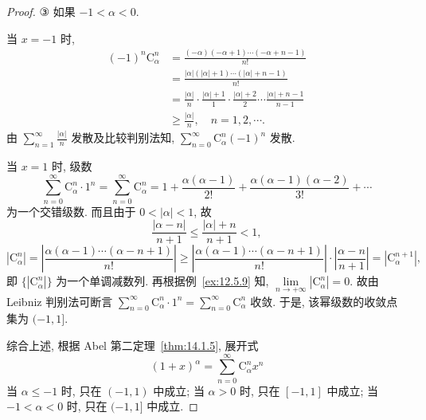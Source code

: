 \begin{proof}
③ 如果 $-1<\alpha<0$.

当 $x=-1$ 时,
\[
  \begin{aligned}
    (-1)^{n}\mathrm{C}_{\alpha}^{n}&=\frac{(-\alpha)(-\alpha+1)\cdots(-\alpha+n-1)}{n!}\\
    &=\frac{|\alpha|(|\alpha|+1)\cdots(|\alpha|+n-1)}{n!}\\
    &=\frac{|\alpha|}{n}\cdot\frac{|\alpha|+1}{1}\cdot\frac{|\alpha|+2}{2}\cdots\frac{|\alpha|+n-1}{n-1}\\
    &\geqslant\frac{|\alpha|}{n},\quad n=1,2,\cdots.
  \end{aligned}
\]
由 $\sum_{n=1}^{\infty}\frac{|\alpha|}{n}$ 发散及比较判别法知, $\sum_{n=0}^{\infty}\mathrm{C}_{\alpha}^{n}(-1)^{n}$ 发散.

当 $x=1$ 时, 级数
\[
  \sum_{n=0}^{\infty}\mathrm{C}_{\alpha}^{n}\cdot1^{n}=\sum_{n=0}^{\infty}\mathrm{C}_{\alpha}^{n}=1+\frac{\alpha(\alpha-1)}{2!}+\frac{\alpha(\alpha-1)(\alpha-2)}{3!}+\cdots
\]
为一个交错级数. 而且由于 $0<|\alpha|<1$, 故
\[
  \frac{|\alpha-n|}{n+1}\leqslant\frac{|\alpha|+n}{n+1}<1,
\]
\[
  |\mathrm{C}_{\alpha}^{n}|=\left|\frac{\alpha(\alpha-1)\cdots(\alpha-n+1)}{n!}\right|\geqslant\left|\frac{\alpha(\alpha-1)\cdots(\alpha-n+1)}{n!}\right|\cdot\left|\frac{\alpha-n}{n+1}\right|=|\mathrm{C}_{\alpha}^{n+1}|,
\]
即 $\{|\mathrm{C}_{\alpha}^{n}|\}$ 为一个单调减数列. 再根据例~\ref{ex:12.5.9} 知, $\lim\limits_{n\to+\infty}|\mathrm{C}_{\alpha}^{n}|=0$. 故由 Leibniz 判别法可断言 $\sum_{n=0}^{\infty}\mathrm{C}_{\alpha}^{n}\cdot1^{n}=\sum_{n=0}^{\infty}\mathrm{C}_{\alpha}^{n}$ 收敛. 于是, 该幂级数的收敛点集为 $(-1,1]$.

综合上述, 根据 Abel 第二定理~\ref{thm:14.1.5}, 展开式
\[
  (1+x)^{\alpha}=\sum_{n=0}^{\infty}\mathrm{C}_{\alpha}^{n}x^{n}
\]
当 $\alpha\leqslant-1$ 时, 只在 $(-1,1)$ 中成立; 当 $\alpha>0$ 时, 只在 $[-1,1]$ 中成立; 当 $-1<\alpha<0$ 时, 只在 $(-1,1]$ 中成立.


\end{proof}
